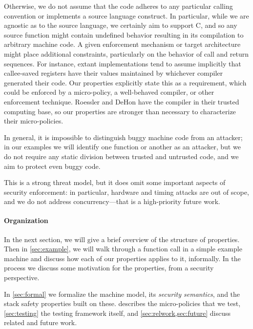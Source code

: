 \documentclass[10pt,conference]{ieeetran}%
\theoremstyle{definition}
\begin{document}
Otherwise, we do not assume that the code adheres to any particular
calling convention or implements a source language construct.
In particular, while we are agnostic as to the source
language, we certainly aim to support C, and so any source function might contain undefined
behavior resulting in its compilation to arbitrary machine code. A given enforcement
mechanism or target architecture might place additional constraints, particularly on the behavior of
call and return sequences. For instance, extant implementations tend to assume
implicitly that callee-saved registers have their values maintained by whichever compiler
generated their code. Our properties explicitly state this as a requirement,
which could be enforced by a micro-policy, a well-behaved compiler, or other enforcement technique.
Roessler and DeHon have the compiler in their trusted computing base, so our properties
are stronger than necessary to characterize their micro-policies.

In general, it is impossible to distinguish buggy machine code from an attacker; in
our examples we will identify one function or another as an attacker, but we do not
require any static division between trusted and untrusted code, and we aim to protect
even buggy code.

This is a strong threat model, but it does omit some important aspects of
security enforcement: in particular, hardware and timing attacks are out of scope, and
we do not address concurrency---that is a high-priority future work.
%

\paragraph*{Organization}

In the next section, we will give a brief overview of the structure of properties.
Then in \cref{sec:example}, we will walk through a function
call in a simple example machine and discuss how each of our properties applies to it,
informally. In the process we discuss some motivation for the properties, from a security
perspective.

In \cref{sec:formal} we formalize the machine model, 
its {\em security semantics}, and the stack safety properties built on these. 
 describes the micro-policies that we test,
\cref{sec:testing} the testing framework itself, and
\cref{sec:relwork,sec:future} discuss related and future work.

\end{document}
